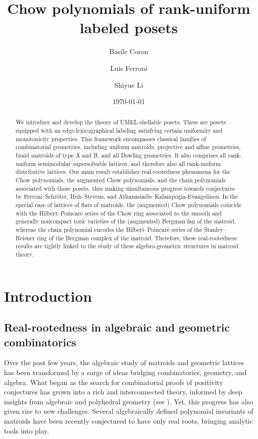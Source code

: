 \documentclass[11pt,a4paper]{amsart}
\title{Chow polynomials of rank-uniform labeled posets}
\author{Basile Coron}
\author{Luis Ferroni}
\author{Shiyue Li}
\date{\today}
\theoremstyle{results}
\theoremstyle{definitions}
\begin{document}
\begin{abstract}
     We introduce and develop the theory of UMEL-shellable posets. These are posets equipped with an edge-lexicographical labeling satisfying certain uniformity and monotonicity properties. This framework encompasses classical families of combinatorial geometries, including uniform matroids, projective and affine geometries, braid matroids of type A and B, and all Dowling geometries. It also comprises all rank-uniform semimodular supersolvable lattices, and therefore also all rank-uniform distributive lattices. Our main result establishes real-rootedness phenomena for the Chow polynomials, the augmented Chow polynomials, and the chain polynomials associated with those posets, thus making simultaneous progress towards conjectures by Ferroni--Schr\"oter, Huh--Stevens, and Athanasiadis--Kalampogia-Evangelinou. In the special case of lattices of flats of matroids, the (augmented) Chow polynomials coincide with the Hilbert--Poincar\'e series of the Chow ring associated to the smooth and generally noncompact toric varieties of the (augmented) Bergman fan of the matroid, whereas the chain polynomial encodes the Hilbert--Poincar\'e series of the Stanley--Reisner ring of the Bergman complex of the matroid. Therefore, these real-rootedness results are tightly linked to the study of these algebro-geometric structures in matroid theory.
\end{abstract}

\maketitle
\setcounter{tocdepth}{1}\tableofcontents

\section{Introduction}

\subsection{Real-rootedness in algebraic and geometric combinatorics} 
Over the past few years, the algebraic study of matroids and geometric lattices has been transformed by a surge of ideas bridging combinatorics, geometry, and algebra. What began as the search for combinatorial proofs of positivity conjectures has grown into a rich and interconnected theory, informed by deep insights from algebraic and polyhedral geometry (see \cite{ardila-icm22,huh-icm22,eur}). Yet, this progress has also given rise to new challenges. Several algebraically defined polynomial invariants of matroids have been recently conjectured to have only real roots, bringing analytic tools into play.
\end{document}
